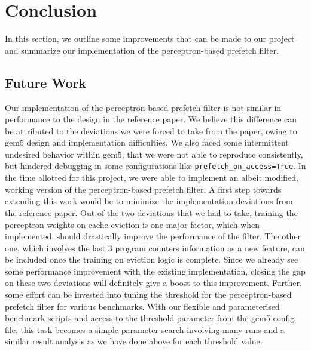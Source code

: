\documentclass[10pt,conference]{IEEEtran}
\begin{document}
\section{Conclusion}
In this section, we outline some improvements that can be made to our project and summarize our implementation of the perceptron-based prefetch filter. 

\subsection{Future Work}
Our implementation of the perceptron-based prefetch filter is not similar in performance to the design in the reference paper\cite{ppf}. We believe this difference can be attributed to the deviations we were forced to take from the paper, owing to gem5 design and implementation difficulties. We also faced some intermittent undesired behavior within gem5, that we were not able to reproduce consistently, but hindered debugging in some configurations like \texttt{prefetch\_on\_access=True}. In the time allotted for this project, we were able to implement an albeit modified, working version of the perceptron-based prefetch filter. A first step towards extending this work would be to minimize the implementation deviations from the reference paper\cite{ppf}. Out of the two deviations that we had to take, training the perceptron weights on cache eviction is one major factor, which when implemented, should drastically improve the performance of the filter. The other one, which involves the last 3 program counters information as a new feature, can be included once the training on eviction logic is complete. Since we already see some performance improvement with the existing implementation, closing the gap on these two deviations will definitely give a boost to this improvement. Further, some effort can be invested into tuning the threshold for the perceptron-based prefetch filter for various benchmarks. With our flexible and parameterised benchmark scripts and access to the threshold parameter from the gem5 config file, this task becomes a simple parameter search involving many runs and a similar result analysis as we have done above for each threshold value. 
\end{document}
